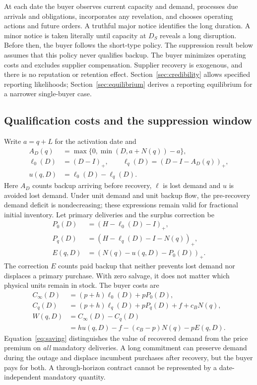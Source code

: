 \documentclass[preprint,11pt,authoryear]{elsarticle}
\begin{document}
At each date the buyer observes current capacity and demand, processes due arrivals and obligations, incorporates any revelation, and chooses operating actions and future orders. A truthful major notice identifies the long duration. A minor notice is taken literally until capacity at $D_S$ reveals a long disruption. Before then, the buyer follows the short-type policy. The suppression result below assumes that this policy never qualifies backup. The buyer minimizes operating costs and excludes supplier compensation. Supplier recovery is exogenous, and there is no reputation or retention effect. Section~\ref{sec:credibility} allows specified reporting likelihoods; Section~\ref{sec:equilibrium} derives a reporting equilibrium for a narrower single-buyer case. 

\subsection{Qualification costs and the suppression window}
Write $a=q+L$ for the activation date and
\begin{align}
 A_D(q)&=\max\{0,\min(D,a+N(q))-a\},\\
 \ell_0(D)&=(D-I)_+,\qquad \ell_q(D)=(D-I-A_D(q))_+,\\
 u(q,D)&=\ell_0(D)-\ell_q(D).
\end{align}
Here $A_D$ counts backup arriving before recovery, $\ell$ is lost demand and $u$ is avoided lost demand. Under unit demand and unit backup flow, the pre-recovery demand deficit is nondecreasing; these expressions remain valid for fractional initial inventory. Let primary deliveries and the surplus correction be
\begin{align}
 P_0(D)&=(H-\ell_0(D)-I)_+,\\
 P_q(D)&=(H-\ell_q(D)-I-N(q))_+,\\
 E(q,D)&=(N(q)-u(q,D)-P_0(D))_+.
\end{align}
The correction $E$ counts paid backup that neither prevents lost demand nor displaces a primary purchase. With zero salvage, it does not matter which physical units remain in stock. The buyer costs are
\begin{align}
 C_\infty(D)&=(p+h)\ell_0(D)+pP_0(D),\\
 C_q(D)&=(p+h)\ell_q(D)+pP_q(D)+f+c_BN(q),\\
 W(q,D)&=C_\infty(D)-C_q(D)\nonumber\\
 &=h u(q,D)-f-(c_B-p)N(q)-pE(q,D).\label{eq:saving}
\end{align}
Equation~\eqref{eq:saving} distinguishes the value of recovered demand from the price premium on \emph{all} mandatory deliveries. A long commitment can preserve demand during the outage and displace incumbent purchases after recovery, but the buyer pays for both. A through-horizon contract cannot be represented by a date-independent mandatory quantity.
\end{document}
